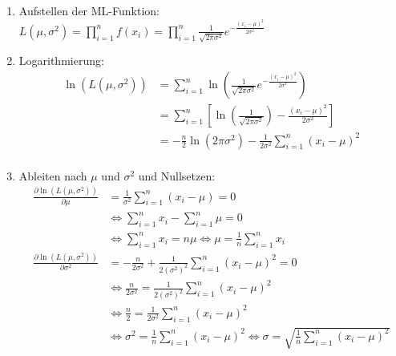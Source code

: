 \begin{enumerate}
    \item Aufstellen der ML-Funktion: \(L(\mu, \sigma^2)=\prod_{i=1}^{n}f(x_i)=\prod_{i=1}^{n}\frac{1}{\sqrt{2\pi\sigma^2}}e^{-\frac{(x_i-\mu)^2}{2\sigma^2}}\)
    \item Logarithmierung:\\
        \begin{equation*}
            \begin{split}
            \ln(L(\mu, \sigma^2))&=\sum_{i=1}^{n}\ln(\frac{1}{\sqrt{2\pi\sigma^2}}e^{-\frac{(x_i-\mu)^2}{2\sigma^2}})\\
            &=\sum_{i=1}^{n}\left [ \ln(\frac{1}{\sqrt{2\pi\sigma^2}})-\frac{(x_i-\mu)^2}{2\sigma^2}\right ]\\
            &=-\frac{n}{2}\ln(2\pi\sigma^2)-\frac{1}{2\sigma^2}\sum_{i=1}^{n}(x_i-\mu)^2\\
            \end{split}
        \end{equation*}
    \item Ableiten nach \(\mu\) und \(\sigma^2\) und Nullsetzen:
        \begin{equation*}
            \begin{split}
            \frac{\partial \ln(L(\mu, \sigma^2))}{\partial \mu}&=\frac{1}{\sigma^2}\sum_{i=1}^{n}(x_i-\mu)=0\\
            &\Leftrightarrow \sum_{i=1}^{n}x_i-\sum_{i=1}^{n}\mu=0\\
            &\Leftrightarrow \sum_{i=1}^{n}x_i=n\mu \Leftrightarrow \mu=\frac{1}{n}\sum_{i=1}^{n}x_i\\
            \frac{\partial \ln(L(\mu, \sigma^2))}{\partial \sigma^2}&=-\frac{n}{2\sigma^2}+\frac{1}{2(\sigma^2)^2}\sum_{i=1}^{n}(x_i-\mu)^2=0\\
            &\Leftrightarrow \frac{n}{2\sigma^2}=\frac{1}{2(\sigma^2)^2}\sum_{i=1}^{n}(x_i-\mu)^2\\
            &\Leftrightarrow \frac{n}{2}=\frac{1}{2\sigma^2}\sum_{i=1}^{n}(x_i-\mu)^2\\
            &\Leftrightarrow \sigma^2=\frac{1}{n}\sum_{i=1}^{n}(x_i-\mu)^2 \Leftrightarrow \sigma=\sqrt{\frac{1}{n}\sum_{i=1}^{n}(x_i-\mu)^2}\\
            \end{split}
        \end{equation*}
\end{enumerate}
